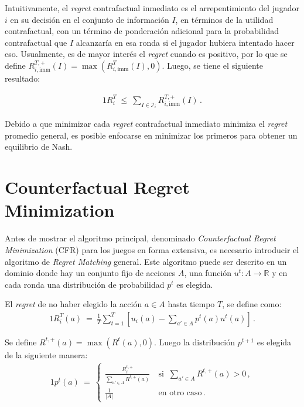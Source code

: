 Intuitivamente, el \textit{regret} contrafactual inmediato es el arrepentimiento del jugador $i$ en su decisión en el conjunto de información $I$, en términos de la utilidad contrafactual, con un término de ponderación adicional para la probabilidad contrafactual que $I$ alcanzaría en esa ronda si el jugador hubiera intentado hacer eso. Usualmente, es de mayor interés el \textit{regret} cuando es positivo, por lo que se define $R_{i, \text{imm}}^{T, +} (I) = \max(R^T_{i, \text{imm}} (I), 0)$. Luego, se tiene el siguiente resultado:

\begin{theorem}
\begin{alignat}{1}
R_i^T\ \leq\ \sum_{I \in \mathcal{I}_i} R_{i, \text{imm}}^{T, +}(I) \,.
\end{alignat}
\end{theorem}

Debido a que minimizar cada \textit{regret} contrafactual inmediato minimiza el \textit{regret} promedio general, es posible enfocarse en minimizar los primeros para obtener un equilibrio de Nash.

\section{Counterfactual Regret Minimization}

Antes de mostrar el algoritmo principal, denominado \textit{Counterfactual Regret Minimization} (CFR) para los juegos en forma extensiva, es necesario introducir el algoritmo de \textit{Regret Matching} general. Este algoritmo puede ser descrito en un dominio donde hay un conjunto fijo de acciones $A$, una función $u^t : A \rightarrow \mathbb{R}$ y en cada ronda una distribución de probabilidad $p^t$ es elegida.

\begin{definition}
\label{def:regret}
El \textit{regret} de no haber elegido la acción $a \in A$ hasta tiempo $T$, se define como:
\begin{alignat}{1}
R_i^T(a)\ =\ \frac{1}{T} \sum_{t = 1}^T \left[u_i(a) - \sum_{a' \in A}p^t(a)u^t(a)\right] \,.
\end{alignat}
\end{definition}

Se define $R^{t, +}(a) = \max(R^t(a), 0)$. Luego la distribución $p^{t+1}$ es elegida de la siguiente manera:
\begin{alignat}{1}
p^t(a)\ =\ 
\begin{cases}
\frac{R_i^{t, +}}{\sum_{a' \in A} R^{t, +}(a)}\ & \text{si }\ \sum_{a' \in A} R^{t, +}(a) > 0 \,, \\
\frac{1}{|A|}\ & \text{en otro caso} \,.
\end{cases}
\end{alignat}

